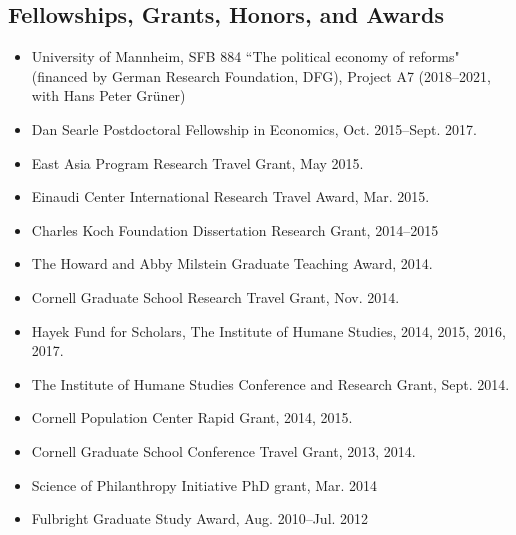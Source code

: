\documentclass[margin, letterpaper]{res}
\begin{document}
\begin{resume}
\section{Fellowships, Grants, Honors, and Awards}
\begin{itemize}
\item University of Mannheim, SFB 884 ``The political economy of reforms" (financed by German Research Foundation, DFG), Project A7 (2018--2021, with Hans Peter Gr{\"u}ner)
\item Dan Searle Postdoctoral Fellowship in Economics, Oct. 2015--Sept. 2017.
\item East Asia Program Research Travel Grant, May 2015.
\item Einaudi Center International Research Travel Award, Mar. 2015.
\item Charles Koch Foundation Dissertation Research Grant, 2014--2015
\item The Howard and Abby Milstein Graduate Teaching Award, 2014.
\item Cornell Graduate School Research Travel Grant, Nov. 2014.
\item Hayek Fund for Scholars, The Institute of Humane Studies, 2014, 2015, 2016, 2017.
\item The Institute of Humane Studies Conference and Research Grant, Sept. 2014.
\item Cornell Population Center Rapid Grant, 2014, 2015.
\item Cornell Graduate School Conference Travel Grant, 2013, 2014.
\item Science of Philanthropy Initiative PhD grant, Mar. 2014
\item Fulbright Graduate Study Award, Aug. 2010--Jul. 2012
\end{itemize}


\end{resume}
\end{document}

